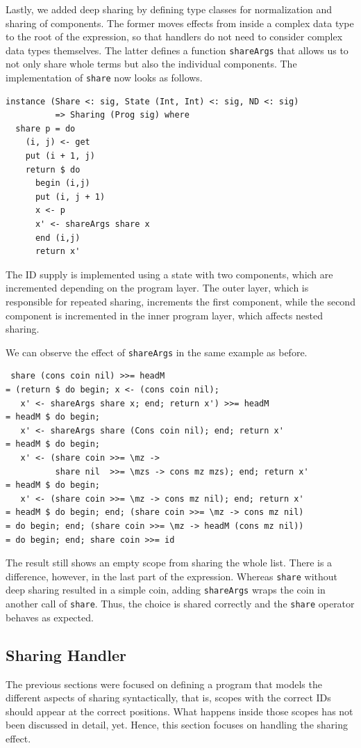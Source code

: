 \documentclass[a4paper, 11pt, fleqn, twoside, abstract=on]{scrreprt}
\newcommand{\hinl}[1]{\texttt{#1}}
\begin{document}
Lastly, we added deep sharing by defining type classes for normalization and sharing of components.
The former moves effects from inside a complex data type to the root of the expression, so that handlers do not need to consider complex data types themselves.
The latter defines a function \hinl{shareArgs} that allows us to not only share whole terms but also the individual components.
The implementation of \hinl{share} now looks as follows.

\begin{verbatim}
instance (Share <: sig, State (Int, Int) <: sig, ND <: sig) 
          => Sharing (Prog sig) where
  share p = do
    (i, j) <- get
    put (i + 1, j)
    return $ do
      begin (i,j)
      put (i, j + 1)
      x <- p
      x' <- shareArgs share x
      end (i,j)
      return x'
\end{verbatim}

The ID supply is implemented using a state with two components, which are incremented depending on the program layer.
The outer layer, which is responsible for repeated sharing, increments the first component, while the second component is incremented in the inner program layer, which affects nested sharing.

We can observe the effect of \hinl{shareArgs} in the same example as before.

\begin{verbatim}
 share (cons coin nil) >>= headM
= (return $ do begin; x <- (cons coin nil); 
   x' <- shareArgs share x; end; return x') >>= headM
= headM $ do begin; 
   x' <- shareArgs share (Cons coin nil); end; return x'
= headM $ do begin; 
   x' <- (share coin >>= \mz -> 
          share nil  >>= \mzs -> cons mz mzs); end; return x'
= headM $ do begin; 
   x' <- (share coin >>= \mz -> cons mz nil); end; return x'
= headM $ do begin; end; (share coin >>= \mz -> cons mz nil)
= do begin; end; (share coin >>= \mz -> headM (cons mz nil))
= do begin; end; share coin >>= id
\end{verbatim}

The result still shows an empty scope from sharing the whole list.
There is a difference, however, in the last part of the expression.
Whereas \hinl{share} without deep sharing resulted in a simple coin, adding \hinl{shareArgs} wraps the coin in another call of \hinl{share}.
Thus, the choice is shared correctly and the \hinl{share} operator behaves as expected.

\subsection{Sharing Handler}
The previous sections were focused on defining a program that models the different aspects of sharing syntactically, that is, scopes with the correct IDs should appear at the correct positions.
What happens inside those scopes has not been discussed in detail, yet.
Hence, this section focuses on handling the sharing effect.
\end{document}
